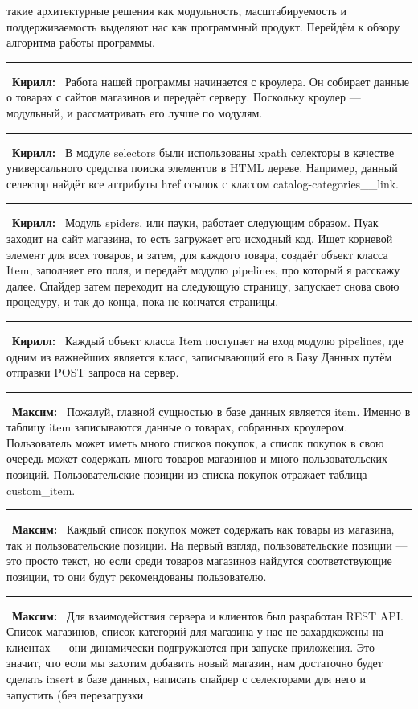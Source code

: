\documentclass[12pt]{article}
\newcommand{\kir}{\textbf{Кирилл: }}
\renewcommand{\max}{\textbf{Максим: }}
\renewcommand{\line}{\noindent\rule{\textwidth}{1pt}}
\begin{document}
такие архитектурные решения как модульность, масштабируемость и
поддерживаемость выделяют нас как программный продукт. Перейдём к обзору
алгоритма работы программы.\\
\line\
\kir\ Работа нашей программы начинается с кроулера. Он собирает данные о товарах с
сайтов магазинов и передаёт серверу. Поскольку кроулер --- модульный, и
рассматривать его лучше по модулям.\\
\line\
\kir\ В модуле selectors были использованы xpath селекторы в качестве
универсального средства поиска элементов в HTML дереве. Например, данный
селектор найдёт все аттрибуты href ссылок с классом {\scriptsize
catalog-categories\_\_link}.\\
\line\
\kir\ Модуль spiders, или пауки, работает следующим образом. Пуак заходит на
сайт магазина, то есть загружает его исходный код. Ищет корневой элемент для
всех товаров, и затем, для каждого товара, создаёт объект класса Item,
заполняет его поля, и передаёт модулю pipelines, про который я расскажу далее.
Спайдер затем переходит на следующую страницу, запускает снова свою процедуру,
и так до конца, пока не кончатся страницы.\\
\line\
\kir\ Каждый объект класса Item поступает на вход модулю pipelines, где одним из
важнейших является класс, записывающий его в Базу Данных путём отправки
POST запроса на сервер.\\
\line\
\max\ Пожалуй, главной сущностью в базе данных является item. Именно в таблицу item
записываются данные о товарах, собранных кроулером. Пользователь может иметь
много списков покупок, а список покупок в свою очередь может содержать много
товаров магазинов и много пользовательских позиций.  Пользовательские позиции
из списка покупок отражает таблица custom\_item.\\
\line\
\max\ Каждый список покупок может содержать как товары из магазина, так и
пользовательские позиции. На первый взгляд, пользовательские позиции --- это
просто текст, но если среди товаров магазинов найдутся соответствующие
позиции, то они будут рекомендованы пользователю.\\
\line\
\max\ Для взаимодействия сервера и клиентов был разработан REST API.\\ Список
магазинов, список категорий для магазина у нас не захардкожены на клиентах —
они динамически подгружаются при запуске приложения. Это значит, что если мы
захотим добавить новый магазин, нам достаточно будет сделать insert в базе
данных, написать спайдер с селекторами для него и запустить (без перезагрузки
\end{document}
